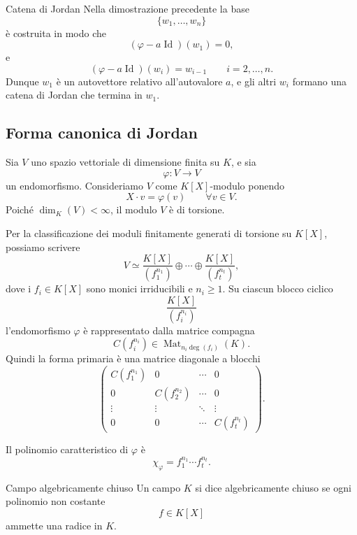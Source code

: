 \documentclass[a4paper]{article}
\begin{document}
\begin{radioactive}
\begin{snippetremark}{Catena di Jordan}
    Nella dimostrazione precedente la base
    \[
        \{w_1,\ldots,w_n\}
    \]
    è costruita in modo che
    \[
        (\varphi-a\operatorname{Id})(w_1)=0,
    \]
    e
    \[
        (\varphi-a\operatorname{Id})(w_i)=w_{i-1}
        \qquad
        i=2,\ldots,n.
    \]
    Dunque \(w_1\) è un autovettore relativo all'autovalore \(a\), e gli altri \(w_i\) formano una catena di Jordan che termina in \(w_1\).
\end{snippetremark}
\end{radioactive}

\pagebreak

\subsection{Forma canonica di Jordan}

\begin{radioactive}
Sia \(V\) uno spazio vettoriale di dimensione finita su \(K\), e sia
\[
    \varphi\colon V\to V
\]
un endomorfismo. Consideriamo \(V\) come \(K[X]\)-modulo ponendo
\[
    X\cdot v=\varphi(v)
    \qquad
    \forall v\in V.
\]
Poiché \(\dim_K(V)<\infty\), il modulo \(V\) è di torsione.

Per la classificazione dei moduli finitamente generati di torsione su \(K[X]\), possiamo scrivere
\[
    V\simeq
    \frac{K[X]}{(f_1^{n_1})}
    \oplus
    \cdots
    \oplus
    \frac{K[X]}{(f_t^{n_t})},
\]
dove i \(f_i\in K[X]\) sono monici irriducibili e \(n_i\geq 1\).
Su ciascun blocco ciclico
\[
    \frac{K[X]}{(f_i^{n_i})}
\]
l'endomorfismo \(\varphi\) è rappresentato dalla matrice compagna
\[
    C(f_i^{n_i})\in \operatorname{Mat}_{n_i\deg(f_i)}(K).
\]
Quindi la forma primaria è una matrice diagonale a blocchi
\[
    \begin{pmatrix}
        C(f_1^{n_1}) & 0 & \cdots & 0\\
        0 & C(f_2^{n_2}) & \cdots & 0\\
        \vdots & \vdots & \ddots & \vdots\\
        0 & 0 & \cdots & C(f_t^{n_t})
    \end{pmatrix}.
\]

Il polinomio caratteristico di \(\varphi\) è
\[
    \chi_\varphi
    =
    f_1^{n_1}\cdots f_t^{n_t}.
\]
\end{radioactive}

\begin{radioactive}
\begin{snippetdefinition}{Campo algebricamente chiuso}
    Un campo \(K\) si dice algebricamente chiuso se ogni polinomio non costante
    \[
        f\in K[X]
    \]
    ammette una radice in \(K\).
\end{snippetdefinition}
\end{radioactive}
\end{document}
